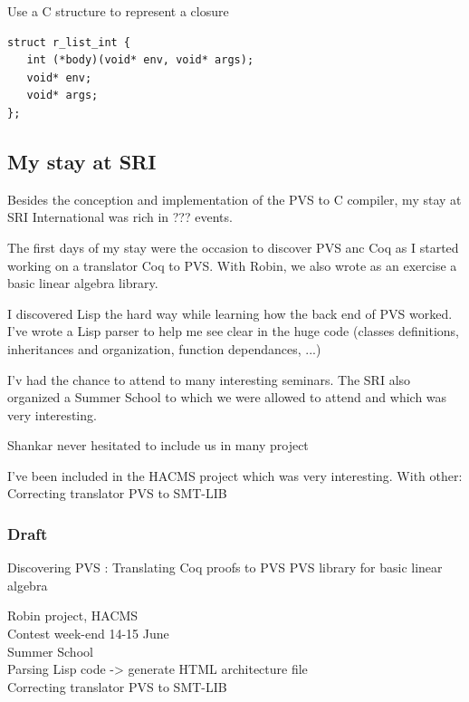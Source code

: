 \documentclass[12pt,a4paper,titlepage]{article}
\begin{document}
Use a C structure to represent a closure
\begin{lstlisting}
struct r_list_int {
   int (*body)(void* env, void* args);
   void* env;
   void* args;
};
\end{lstlisting}



\subsection{My stay at SRI}

Besides the conception and implementation of the PVS to C compiler, my stay at SRI International was rich in ??? events.

The first days of my stay were the occasion to discover PVS anc Coq as I started working on a translator Coq to PVS. With Robin, we also wrote as an exercise a basic linear algebra library.

I discovered Lisp the hard way while learning how the back end of PVS worked. I've wrote a Lisp parser to help me see clear in the huge code (classes definitions, inheritances and organization, function dependances, ...)

I'v had the chance to attend to many interesting seminars. The SRI also organized a Summer School to which we were allowed to attend and which was very interesting.

Shankar never hesitated to include us in many project

I've been included in the HACMS project which was very interesting.
With other:
Correcting translator PVS to SMT-LIB




\subsubsection*{Draft}
Discovering PVS :
Translating Coq proofs to PVS
PVS library for basic linear algebra

Robin project, HACMS \\
Contest week-end 14-15 June \\
Summer School \\
Parsing Lisp code -> generate HTML architecture file\\
Correcting translator PVS to SMT-LIB
\cite{pavol}





\end{document}
